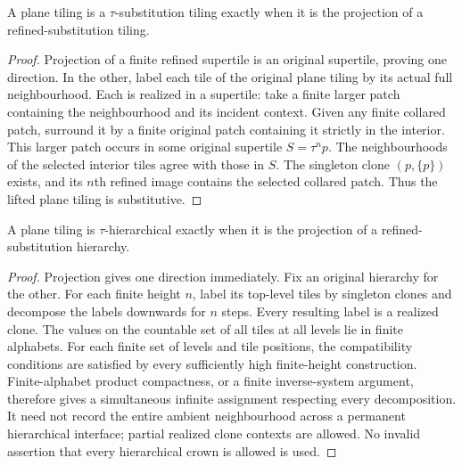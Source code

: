 \begin{lemma}\label{lem:clone-substitution-lift}
A plane tiling is a $\tau$-substitution tiling exactly when it is the
projection of a refined-substitution tiling.
\end{lemma}
\begin{proof}
Projection of a finite refined supertile is an original supertile, proving
one direction. In the other, label each tile of the original plane tiling
by its actual full neighbourhood. Each is realized in a supertile:
take a finite larger patch containing the neighbourhood and its incident
context. Given any finite collared patch, surround it by a finite original
patch containing it strictly in the interior. This larger patch occurs in
some original supertile $S=\tau^n p$. The neighbourhoods of the selected
interior tiles agree with those in $S$. The singleton clone $(p,\{p\})$
exists, and its $n$th refined image contains the selected collared patch.
Thus the lifted plane tiling is substitutive.
\end{proof}

\begin{lemma}\label{lem:clone-hierarchy-lift}
A plane tiling is $\tau$-hierarchical exactly when it is the projection of
a refined-substitution hierarchy.
\end{lemma}
\begin{proof}
Projection gives one direction immediately. Fix an original hierarchy for
the other. For each finite height $n$, label its top-level tiles by
singleton clones and decompose the labels downwards for $n$ steps.
Every resulting label is a realized clone. The values on the countable
set of all tiles at all levels lie in finite alphabets. For each finite
set of levels and tile positions, the compatibility conditions are
satisfied by every sufficiently high finite-height construction.
Finite-alphabet product compactness, or a finite inverse-system argument,
therefore gives a simultaneous infinite assignment respecting every
decomposition. It need not record the entire ambient neighbourhood across
a permanent hierarchical interface; partial realized clone contexts are
allowed. No invalid assertion that every hierarchical crown is allowed is
used.
\end{proof}

